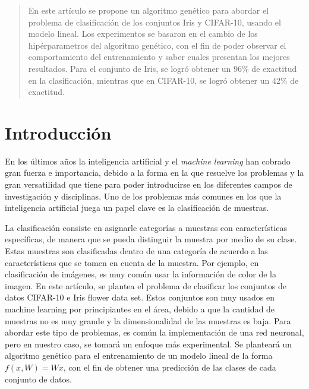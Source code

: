 \documentclass[conference]{IEEEtran}
\begin{document}



\maketitle

\begin{abstract}
	En este artículo se propone un algoritmo genético para abordar el problema de clasificación de los conjuntos Iris y CIFAR-10, usando el modelo lineal. Los experimentos se basaron en el cambio de los hipérparametros del algoritmo genético, con el fin de poder observar el comportamiento del entrenamiento y saber cuales presentan los mejores resultados. Para el conjunto de Iris, se logró obtener un 96\% de exactitud en la clasificación, mientras que en CIFAR-10, se logró obtener un 42\% de exactitud.
\end{abstract}


\section{Introducción}
En los últimos años la inteligencia artificial y el \textit{machine learning} han cobrado gran fuerza e importancia, debido a la forma en la que resuelve  los problemas y la gran versatilidad que tiene para poder introducirse en los diferentes campos de investigación y disciplinas. Uno de los problemas más comunes en los que la inteligencia artificial juega un papel clave es la clasificación de muestras. 

La clasificación consiste en asignarle categorías a muestras con características específicas, de manera que se pueda distinguir la muestra por medio de su clase. Estas muestras son clasificadas dentro de una categoría de acuerdo a las características que se tomen en cuenta de la muestra. Por ejemplo, en clasificación de imágenes, es muy común usar la información de color de la imagen. 
En este artículo, se plantea el problema de clasificar los conjuntos de datos CIFAR-10 e Iris flower data set. Estos conjuntos son muy usados en machine learning por principiantes en el área, debido a que la cantidad de muestras no es muy grande y la dimensionalidad de las muestras es baja.  Para abordar este tipo de problemas, es común la implementación de una red neuronal, pero en nuestro caso, se tomará un enfoque más experimental. Se planteará un algoritmo genético para el entrenamiento de un modelo lineal de la forma $f(x,W) = Wx$, con el fin de obtener una predicción de las clases de cada conjunto de datos.
\end{document}
